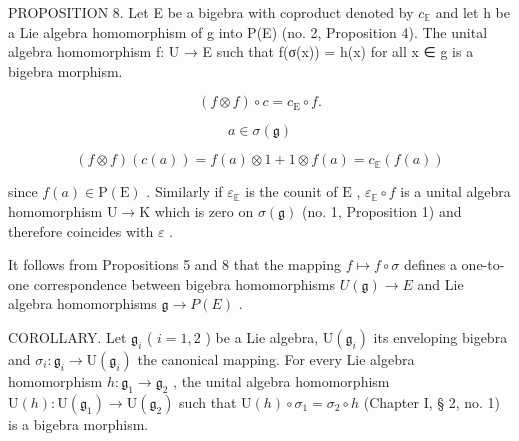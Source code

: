 PROPOSITION 8. Let E be a bigebra with coproduct denoted by \(c_{\mathbb{E}}\) and let h be a Lie algebra homomorphism of g into P(E) (no. 2, Proposition 4). The unital algebra homomorphism f: U → E such that f(σ(x)) = h(x) for all x ∈ g is a bigebra morphism.

\[
(f \otimes f) \circ c = c _ {\mathrm{E}} \circ f.
\]

\[
a \in \sigma (\mathfrak {g})
\]

\[
(f \otimes f) (c (a)) = f (a) \otimes 1 + 1 \otimes f (a) = c _ {\mathbb {E}} (f (a))
\]

since \(f(a) \in \mathrm{P}(\mathrm{E})\) . Similarly if \(\varepsilon_{\mathbb{E}}\) is the counit of \(\mathrm{E}\) , \(\varepsilon_{\mathbb{E}} \circ f\) is a unital algebra homomorphism \(\mathrm{U} \to \mathrm{K}\) which is zero on \(\sigma(\mathfrak{g})\) (no. 1, Proposition 1) and therefore coincides with \(\varepsilon\) .

It follows from Propositions 5 and 8 that the mapping \(f \mapsto f \circ \sigma\) defines a one-to-one correspondence between bigebra homomorphisms \(U(\mathfrak{g}) \to E\) and Lie algebra homomorphisms \(\mathfrak{g} \to P(E)\) .

COROLLARY. Let \(\mathfrak{g}_i\) ( \(i = 1,2\) ) be a Lie algebra, \(\mathrm{U}(\mathfrak{g}_i)\) its enveloping bigebra and \(\sigma_i\colon \mathfrak{g}_i\to \mathrm{U}(\mathfrak{g}_i)\) the canonical mapping. For every Lie algebra homomorphism \(h\colon \mathfrak{g}_1\to \mathfrak{g}_2\) , the unital algebra homomorphism \(\mathrm{U}(h)\colon \mathrm{U}(\mathfrak{g}_1)\to \mathrm{U}(\mathfrak{g}_2)\) such that \(\mathrm{U}(h)\circ \sigma_1 = \sigma_2\circ h\) (Chapter I, § 2, no. 1) is a bigebra morphism.

